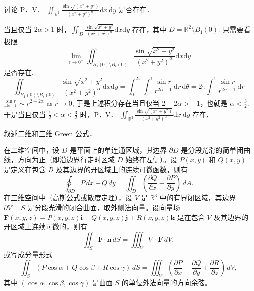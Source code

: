 \begin{exercise}
讨论 P．V． $\iint_{\mathbb{R}^2} \frac{\sin \sqrt{\left(x^2+y^2\right)}}{\left(x^2+y^2\right)^\alpha} \mathrm{d} x \mathrm{~d} y$ 是否存在．
\end{exercise}
当且仅当 $2\alpha>1$ 时，$\iint_{D}\frac{\sin \sqrt{ x^{2}+y^{2} }}{(x^{2}+y^{2})^{\alpha}}\mathrm{d}x\mathrm{d}y$ 存在，其中 $D=\mathbb{R}^{2}\setminus B_1(0)$. 只需要看极限
\[
\lim_{ \epsilon \to 0^{+} } \iint_{B_1(0)\setminus B_{\epsilon}(0)}\frac{\sin \sqrt{ x^{2}+y^{2} }}{(x^{2}+y^{2})^{\alpha}}\mathrm{d}x\mathrm{d}y
\]
是否存在.
\[
 \iint_{B_1(0)\setminus B_{\epsilon}(0)}\frac{\sin \sqrt{ x^{2}+y^{2} }}{(x^{2}+y^{2})^{\alpha}}\mathrm{d}x\mathrm{d}y=\int_{0}^{2\pi} \int_{\epsilon}^{1} \frac{\sin r}{r^{2\alpha-1}} \, \mathrm{d}r  \, \mathrm{d}\theta=2\pi \int_{\epsilon}^{1} \frac{\sin r}{r^{2\alpha-1}} \, \mathrm{d}r  
\]
$\frac{\sin r}{r^{2\alpha-1}}\sim r^{2-2\alpha}$ as $r\to0$, 于是上述积分存在当且仅当 $2-2\alpha>-1$，也就是 $\alpha<\frac{3}{2}$. 于是当且仅当 $\frac{1}{2}<\alpha<\frac{3}{2}$ 时，P．V． $\iint_{\mathbb{R}^2} \frac{\sin \sqrt{\left(x^2+y^2\right)}}{\left(x^2+y^2\right)^\alpha} \mathrm{d} x \mathrm{~d} y$ 存在．

\begin{exercise}
叙述二维和三维 Green 公式．
\end{exercise}
在二维空间中，设 $D$ 是平面上的单连通区域，其边界 $\partial D$ 是分段光滑的简单闭曲线，方向为正（即沿边界行走时区域 $D$ 始终在左侧）。设 $P(x, y)$ 和 $Q(x, y)$ 是定义在包含 $D$ 及其边界的开区域上的连续可微函数，则有
\[
\oint_{\partial D} P \, dx + Q \, dy = \iint_D \left( \frac{\partial Q}{\partial x} - \frac{\partial P}{\partial y} \right) \, dA.
\]
在三维空间中（高斯公式或散度定理），设 $V$ 是 $\mathbb{R}^3$ 中的有界闭区域，其边界 $\partial V = S$ 是分段光滑的闭合曲面，取外侧法向量。设向量场 $\mathbf{F}(x, y, z) = P(x, y, z) \mathbf{i} + Q(x, y, z) \mathbf{j} + R(x, y, z) \mathbf{k}$ 是在包含 $V$ 及其边界的开区域上连续可微的，则有
\[
\iint_S \mathbf{F} \cdot \mathbf{n} \, dS = \iiint_V \nabla \cdot \mathbf{F} \, dV,
\]
或写成分量形式
\[
\iint_S (P \cos \alpha + Q \cos \beta + R \cos \gamma) \, dS = \iiint_V \left( \frac{\partial P}{\partial x} + \frac{\partial Q}{\partial y} + \frac{\partial R}{\partial z} \right) \, dV,
\]
其中 $(\cos \alpha, \cos \beta, \cos \gamma)$ 是曲面 $S$ 的单位外法向量的方向余弦。
